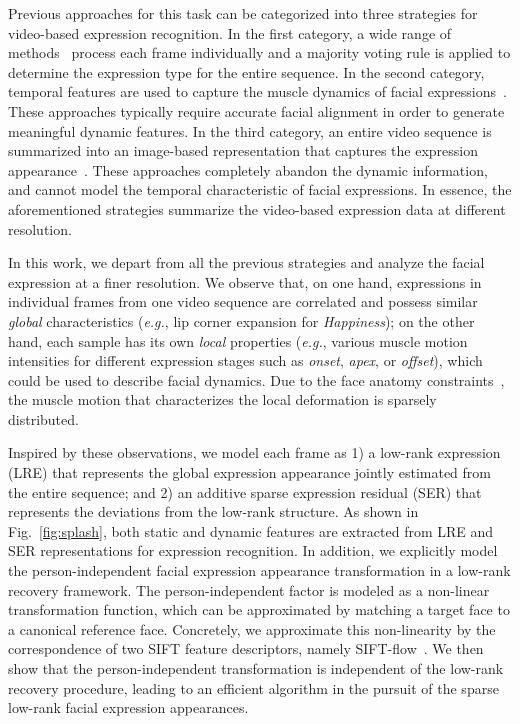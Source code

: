 \documentclass[journal]{IEEEtran}
\begin{document}
Previous approaches for this task can be categorized into three strategies for video-based expression recognition. In the first category, a wide range of methods~\cite{Bartlett_FG11,Valstar_SMCB12} process each frame individually and a majority voting rule is applied to determine the expression type for the entire sequence. In the second category, temporal features are used to capture the muscle dynamics of facial expressions~\cite{Zhao_PAMI07,Huang11}. These approaches typically require accurate facial alignment in order to generate meaningful dynamic features. In the third category, an entire video sequence is summarized into an image-based representation that captures the expression appearance~\cite{Yang_SMCB12,Dahmane_TMM14}. These approaches completely abandon the dynamic information, and cannot model the temporal characteristic of facial expressions. In essence, the aforementioned strategies summarize the video-based expression data at different resolution. 

In this work, we depart from all the previous strategies and analyze the facial expression at a finer resolution. We observe that, on one hand, expressions in individual frames from one video sequence are correlated and possess similar \textit{global} characteristics (\textit{e.g.}, lip corner expansion for \textit{Happiness}); on the other hand, each sample has its own \textit{local} properties (\textit{e.g.}, various muscle motion intensities for different expression stages such as \textit{onset}, \textit{apex}, or \textit{offset}), which could be used to describe facial dynamics. Due to the face anatomy constraints~\cite{Ekman78}, the muscle motion that characterizes the local deformation is sparsely distributed. 

Inspired by these observations, we model each frame as 1) a low-rank expression (LRE) that represents the global expression appearance jointly estimated from the entire sequence; and 2) an additive sparse expression residual (SER) that represents the deviations from the low-rank structure. As shown in Fig.~\ref{fig:splash}, both static and dynamic features are extracted from LRE and SER representations for expression recognition. In addition, we explicitly model the person-independent facial expression appearance transformation in a low-rank recovery framework. The person-independent factor is modeled as a non-linear transformation function, which can be approximated by matching a target face to a canonical reference face. Concretely, we approximate this non-linearity by the correspondence of two SIFT feature descriptors, namely SIFT-flow~\cite{Liu_PAMI11}. We then show that the person-independent transformation is independent of the low-rank recovery procedure, leading to an efficient algorithm in the pursuit of the sparse low-rank facial expression appearances. 
\end{document}
